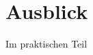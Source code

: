 \documentclass[11pt,a4paper]{report} %
\begin{document}
%

%



\chapter{Ausblick}
\label{ch:ausblick}
Im praktischen Teil

\printbibliography%
\listoffigures
\listoftables
\lstlistoflistings
\appendix


\end{document}
